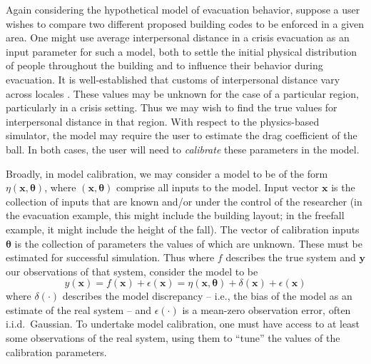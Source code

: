 \documentclass[12pt]{article}
\begin{document}
Again considering the hypothetical model of evacuation behavior, suppose a user wishes to compare two different proposed building codes to be enforced in a given area. 
One might use average interpersonal distance in a crisis evacuation as an input parameter for such a model, both to settle the initial physical distribution of people throughout the building and to influence their behavior during evacuation.
It is well-established that customs of interpersonal distance vary across locales \citep{Sorokowska2017}. 
These values may be unknown for the case of a particular region, particularly in a crisis setting. 
Thus we may wish to find the true values for interpersonal distance in that region. 
With respect to the physics-based simulator, the model may require the user to estimate the drag coefficient of the ball.
In both cases, the user will need to \textit{calibrate} these parameters in the model.

Broadly, in model calibration, we may consider a model to be of the form $\eta(\mathbf x,\boldsymbol \theta)$, where $(\mathbf x,\boldsymbol \theta)$ comprise all inputs to the model. Input vector $\mathbf x$ is the collection of inputs that are known and/or under the control of the researcher (in the evacuation example, this might include the building layout; in the freefall example, it might include the height of the fall).  
The vector of calibration inputs $\boldsymbol \theta$ is the collection of parameters the values of which are unknown. 
These must be estimated for successful simulation. 
Thus where $f$ describes the true system and $\mathbf y$ our observations of that system, consider the model to be 
\begin{equation} \label{eq:model_gen}
	y(\mathbf x)=f(\mathbf x)+\epsilon(\mathbf x)=\eta(\mathbf x,\boldsymbol \theta) + \delta(\mathbf x)+\epsilon(\mathbf x)
\end{equation} 
where $\delta(\cdot)$ describes the model discrepancy -- i.e., the bias of the model as an estimate of the real system -- and $\epsilon(\cdot)$ is a mean-zero observation error, often i.i.d.\ Gaussian. 
To undertake model calibration, one must have access to at least some observations of the real system, using them to ``tune'' the values of the calibration parameters.


\end{document}

